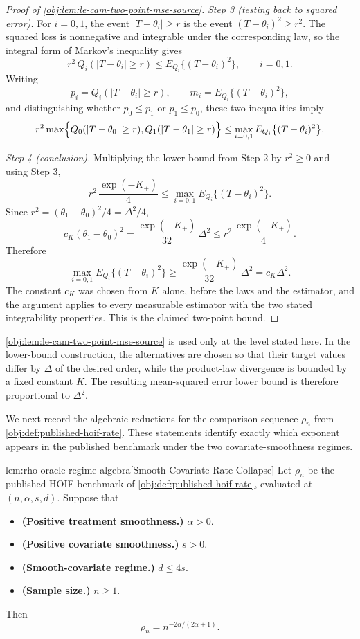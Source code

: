 \documentclass[11pt]{article}
\begin{document}
\begin{proof}[Proof of \cref{obj:lem:le-cam-two-point-mse-source}]
\emph{Step 3 (testing back to squared error).} For \(i=0,1\), the event
\(|T-\theta_i|\ge r\) is the event \((T-\theta_i)^2\ge r^2\). The squared loss is nonnegative and
integrable under the corresponding law, so the integral form of Markov's inequality gives
\[
r^2\,Q_i(|T-\theta_i|\ge r)
\le
E_{Q_i}\bigl\{(T-\theta_i)^2\bigr\},
\qquad i=0,1 .
\]
Writing
\[
p_i=Q_i(|T-\theta_i|\ge r),
\qquad
m_i=E_{Q_i}\bigl\{(T-\theta_i)^2\bigr\},
\]
and distinguishing whether \(p_0\le p_1\) or \(p_1\le p_0\), these two inequalities imply
\[
r^2\max\Bigl\{
Q_0(|T-\theta_0|\ge r),
Q_1(|T-\theta_1|\ge r)
\Bigr\}
\le
\max_{i=0,1}E_{Q_i}\bigl\{(T-\theta_i)^2\bigr\} .
\]

\emph{Step 4 (conclusion).} Multiplying the lower bound from Step 2 by \(r^2\ge0\) and using Step 3,
\[
r^2\,\frac{\exp(-K_+)}{4}
\le
\max_{i=0,1}E_{Q_i}\bigl\{(T-\theta_i)^2\bigr\} .
\]
Since \(r^2=(\theta_1-\theta_0)^2/4=\Delta^2/4\),
\[
c_K(\theta_1-\theta_0)^2
=
\frac{\exp(-K_+)}{32}\,\Delta^2
\le
r^2\,\frac{\exp(-K_+)}{4}.
\]
Therefore
\[
\max_{i=0,1}E_{Q_i}\bigl\{(T-\theta_i)^2\bigr\}
\ge
\frac{\exp(-K_+)}{32}\,\Delta^2
=
c_K\Delta^2 .
\]
The constant \(c_K\) was chosen from \(K\) alone, before the laws and the estimator, and the argument
applies to every measurable estimator with the two stated integrability properties. This is the
claimed two-point bound. %
\end{proof}

\cref{obj:lem:le-cam-two-point-mse-source} is used only at the level stated here. In the lower-bound construction, the alternatives are chosen so that their target values differ by \(\Delta\) of the desired order, while the product-law divergence is bounded by a fixed constant \(K\). The resulting mean-squared error lower bound is therefore proportional to \(\Delta^2\).

We next record the algebraic reductions for the comparison sequence \(\rho_n\) from \cref{obj:def:published-hoif-rate}. These statements identify exactly which exponent appears in the published benchmark under the two covariate-smoothness regimes.

\begin{lemmav}{lem:rho-oracle-regime-algebra}[Smooth-Covariate Rate Collapse]
Let $\rho_n$ be the published HOIF benchmark of \cref{obj:def:published-hoif-rate}, evaluated at $(n,\alpha,s,d)$. Suppose that
\begin{itemize}
\item \textbf{(Positive treatment smoothness.)} $\alpha>0$.
\item \textbf{(Positive covariate smoothness.)} $s>0$.
\item \textbf{(Smooth-covariate regime.)} $d\le 4s$.
\item \textbf{(Sample size.)} $n\ge 1$.
\end{itemize}
Then
\[
\rho_n
=
n^{-2\alpha/(2\alpha+1)} .
\]
\end{lemmav}
\end{document}
